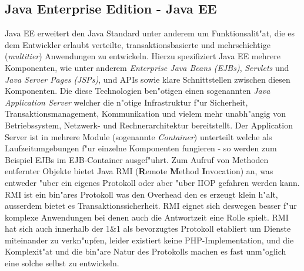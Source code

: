 \subsection{Java Enterprise Edition - Java EE}
\label{sec:intro:stand:jboss}
\label{sec:intro:stand:rmi}
Java EE \cite{JEEHP} erweitert den Java Standard unter anderem um Funktionsalit"at, die es dem Entwickler erlaubt verteilte, transaktionsbasierte und
mehrschichtige (\emph{multitier}) Anwendungen zu entwickeln. Hierzu spezifiziert Java EE mehrere Komponenten, wie unter anderem
\emph{Enterprise Java Beans (EJBs)}, \emph{Servlets} und \emph{Java Server Pages (JSPs)}, und APIs sowie klare Schnittstellen zwischen
diesen Komponenten. Die diese Technologien ben"otigen einen sogenannten \emph{Java Application Server} welcher die n"otige Infrastruktur
f"ur Sicherheit, Transaktionsmanagement, Kommunikation und vielem mehr unabh"angig von Betriebssystem, Netzwerk- und Rechnerarchitektur
bereitstellt. Der Application Server ist in mehrere Module (sogenannte \emph{Container}) unterteilt welche als Laufzeitumgebungen f"ur einzelne
Komponenten fungieren - so werden zum Beispiel EJBs im EJB-Container ausgef"uhrt. Zum Aufruf von Methoden entfernter Objekte bietet Java 
RMI (\textbf{R}emote \textbf{M}ethod \textbf{I}nvocation) an, was entweder "uber ein eigenes Protokoll oder aber "uber IIOP gefahren werden kann.
RMI ist ein bin"ares Protokoll was den Overhead den es erzeugt klein h"alt, ausserdem bietet es Transaktionssicherheit. RMI eignet sich deswegen besser f"ur 
komplexe Anwendungen bei denen auch die Antwortzeit eine Rolle spielt. RMI hat sich auch innerhalb der 1\&1 als bevorzugtes Protokoll 
etabliert um Dienste miteinander zu verkn"upfen, leider existiert keine PHP-Implementation, und die Komplexit"at und die bin"are Natur des
Protokolls machen es fast unm"oglich eine solche selbst zu entwickeln.


